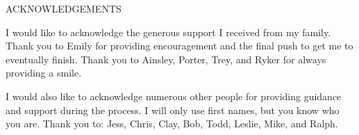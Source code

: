 \documentclass[SDSUThesis.tex]{subfiles}
\begin{document}
\newpage

\begin{center}
ACKNOWLEDGEMENTS\\
\end{center}

I would like to acknowledge the generous support I received from my family. Thank you
to Emily for providing encouragement and the final push to get me to eventually finish.
Thank you to Ainsley, Porter, Trey, and Ryker for always providing a smile.

I would also like to acknowledge numerous other people for providing
guidance and support during the process.
I will only use first names, but you know who you are. Thank you to: Jess, Chris, Clay, 
Bob, Todd, Leslie, Mike, and Ralph.
\end{document}
